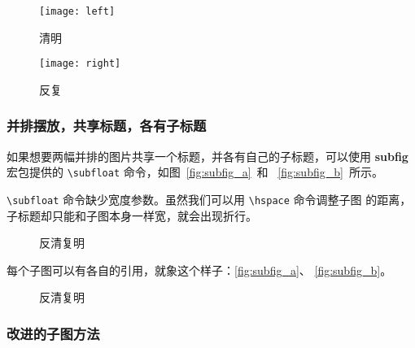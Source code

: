 \begin{figure}[htbp]
\centering
\begin{minipage}[t]{0.3\textwidth}
    \centering
    \texttt{[image: left]}
    \caption{清明}
    \label{fig:golfer3}
\end{minipage}
\hspace{36pt}
\begin{minipage}[t]{0.3\textwidth}
    \centering
    \texttt{[image: right]}
    \caption{反复}
    \label{fig:golfer4}
\end{minipage}
\end{figure}

\subsubsection*{并排摆放，共享标题，各有子标题}

如果想要两幅并排的图片共享一个标题，并各有自己的子标题，可以使用
\textbf{subfig} 宏包提供的 \verb|\subfloat| 命令，如图~\ref{fig:subfig_a}~和
~\ref{fig:subfig_b}~所示。

\verb|\subfloat| 命令缺少宽度参数。虽然我们可以用 \verb|\hspace| 命令调整子图
的距离，子标题却只能和子图本身一样宽，就会出现折行。

\begin{code}
\begin{figure}[htbp]
\centering
{}
\hspace{36pt}
\caption{反清复明}
\end{figure}
\end{code}

每个子图可以有各自的引用，就象这个样子：\ref{fig:subfig_a}、
\ref{fig:subfig_b}。

\begin{figure}[htbp]
\centering
{}
\hspace{36pt}
\caption{反清复明}
\end{figure}

\subsubsection*{改进的子图方法}

